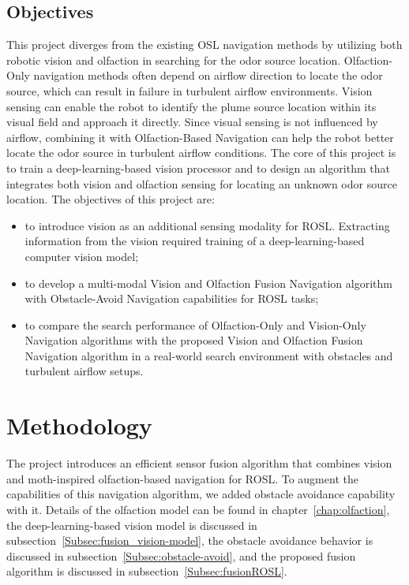 \subsection{Objectives}\label{Subsec:fusionObjectives}
This project diverges from the existing OSL navigation methods by utilizing both robotic vision and olfaction in searching for the odor source location. Olfaction-Only navigation methods often depend on airflow direction to locate the odor source, which can result in failure in turbulent airflow environments. Vision sensing can enable the robot to identify the plume source location within its visual field and approach it directly. Since visual sensing is not influenced by airflow, combining it with Olfaction-Based Navigation can help the robot better locate the odor source in turbulent airflow conditions. The core of this project is to train a deep-learning-based vision processor and to design an algorithm that integrates both vision and olfaction sensing for locating an unknown odor source location.
The objectives of this project are:
\begin{itemize}
\item to introduce vision as an additional sensing modality for ROSL. Extracting information from the vision required training of a deep-learning-based computer vision model;
\item to develop a multi-modal Vision and Olfaction Fusion Navigation algorithm with Obstacle-Avoid Navigation capabilities for ROSL tasks;
\item to compare the search performance of Olfaction-Only and Vision-Only Navigation algorithms with the proposed Vision and Olfaction Fusion Navigation algorithm in a real-world search environment with obstacles and turbulent airflow setups.    
\end{itemize}


\section{Methodology}
The project introduces an efficient sensor fusion algorithm that combines vision and moth-inspired olfaction-based navigation for ROSL. To augment the capabilities of this navigation algorithm, we added obstacle avoidance capability with it. Details of the olfaction model can be found in chapter~\ref{chap:olfaction}, the deep-learning-based vision model is discussed in subsection~\ref{Subsec:fusion_vision-model}, the obstacle avoidance behavior is discussed in subsection~\ref{Subsec:obstacle-avoid}, and the proposed fusion algorithm is discussed in subsection~\ref{Subsec:fusionROSL}.

